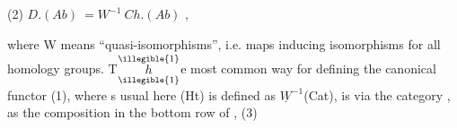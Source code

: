 
(2) \qquad $D.(Ab) \ = W^{-1}\ Ch.(Ab)$ \qquad ,

where W means ``quasi-isomorphisms'', i.e. maps inducing isomorphisms for
all homology groups. T$\overset{\illegible{1}}{\underset{\illegible{1}}{h}}$e most common way for defining the canonical
functor (1), where s usual here (Ht) is defined as $\underline{W}^{-1}$(Cat), is
via the  category \inserted{$\Delta$}, as the composition in the bottom row of
 \quad ,
(3)

